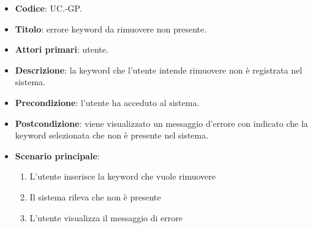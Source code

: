 	\begin{itemize}
		\item \textbf{Codice}: UC\theuccount.\thesubuccount-GP.
		\item \textbf{Titolo}: errore keyword da rimuovere non presente.
		\item \textbf{Attori primari}: utente.
		\item \textbf{Descrizione}: la keyword che l'utente intende rimuovere non è registrata nel sistema.
		\item \textbf{Precondizione}: l’utente ha acceduto al sistema.
		\item \textbf{Postcondizione}: viene visualizzato un messaggio d'errore con indicato che la keyword	selezionata che non è presente nel sistema.
		\item \textbf{Scenario principale}:
		\begin{enumerate}
			\item L'utente inserisce la keyword che vuole rimuovere
			\item Il sistema rileva che non è presente 
			\item L'utente visualizza il messaggio di errore
		\end{enumerate}
	\end{itemize}
	
